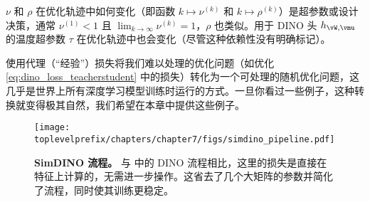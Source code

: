 \documentclass[../../book-main_zh.tex]{subfiles}
\begin{document}
\(\nu\) 和 \(\rho\) 在优化轨迹中如何变化（即函数 \(k \mapsto \nu^{(k)}\) 和 \(k \mapsto \rho^{(k)}\)）是超参数或设计决策，通常 \(\nu^{(1)} < 1\) 且 \(\lim_{k \to \infty}\nu^{(k)} = 1\)，\(\rho\) 也类似。用于 DINO 头 \(h_{\vW, \vmu}\) 的温度超参数 \(\tau\) 在优化轨迹中也会变化（尽管这种依赖性没有明确标记）。

使用代理（“经验”）损失将我们难以处理的优化问题（如优化 \eqref{eq:dino_loss_teacherstudent} 中的损失）转化为一个可处理的随机优化问题，这几乎是世界上所有深度学习模型训练时运行的方式。一旦你看过一些例子，这种转换就变得极其自然，我们希望在本章中提供这些例子。

\begin{figure}
    \centering 
    \texttt{[image: \\toplevelprefix/chapters/chapter7/figs/simdino\_pipeline.pdf]}
    \caption{\small\textbf{SimDINO 流程。} 与  中的 DINO 流程相比，这里的损失是直接在特征上计算的，无需进一步操作。这省去了几个大矩阵的参数并简化了流程，同时使其训练更稳定。}\label{fig:simdino_pipeline}
\end{figure}
\end{document}
